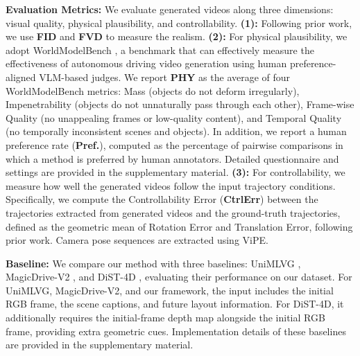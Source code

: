 \documentclass[runningheads]{llncs}
\begin{document}
\setlength{\parskip}{1pt}
\noindent \textbf{Evaluation Metrics:}  
We evaluate generated videos along three dimensions: visual quality, physical plausibility, and controllability. \textbf{(1):} Following prior work, we use \textbf{FID} and \textbf{FVD} to measure the realism. 
 \textbf{(2):} For physical plausibility, we adopt WorldModelBench \cite{li2025worldmodelbench}, a benchmark that can effectively measure the effectiveness of autonomous driving video generation using human preference-aligned VLM-based judges.  We report \textbf{PHY} as the average of four WorldModelBench metrics: Mass (objects do not deform irregularly), Impenetrability (objects do not unnaturally pass through each other), Frame-wise Quality (no unappealing frames or low-quality content), and Temporal Quality (no temporally inconsistent scenes and objects).  In addition, we report a human preference rate (\textbf{Pref.}), computed as the percentage of pairwise comparisons in which a method is preferred by human annotators. Detailed questionnaire and settings are provided in the supplementary material. \textbf{(3):} For controllability, we measure how well the generated videos follow the input trajectory conditions. Specifically, we compute the Controllability Error (\textbf{CtrlErr}) between the trajectories extracted from generated videos and the ground-truth trajectories, defined as the geometric mean of Rotation Error and Translation Error, following prior work\cite{he2024cameractrl,duan2025worldscore}. Camera pose sequences are extracted using ViPE\cite{huang2025vipe}. 

\setlength{\parskip}{1pt}
\noindent \textbf{Baseline:}  
We compare our method with three baselines:  UniMLVG \cite{chen2025unimlvg}, MagicDrive-V2 \cite{gao2025magicdrive}, and DiST-4D \cite{guo2025dist}, evaluating their performance on our dataset. For UniMLVG, MagicDrive-V2, and our framework, the input includes the initial RGB frame, the scene captions, and future layout information. For DiST-4D, it additionally requires the initial-frame depth map alongside the initial RGB frame, providing extra geometric cues. Implementation details of these baselines are provided in the supplementary material.
\end{document}
